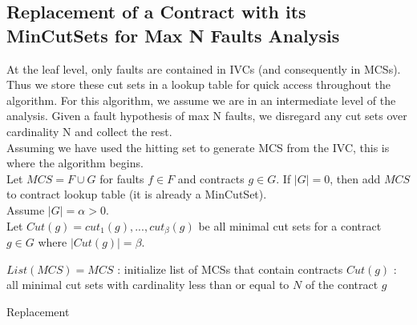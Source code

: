 \subsection{Replacement of a Contract with its MinCutSets for Max N Faults Analysis}

At the leaf level, only faults are contained in IVCs (and consequently in MCSs). Thus we store these cut sets in a lookup table for quick access throughout the algorithm. For this algorithm, we assume we are in an intermediate level of the analysis. Given a fault hypothesis of max N faults, we disregard any cut sets over cardinality N and collect the rest.\\

Assuming we have used the hitting set to generate MCS from the IVC, this is where the algorithm begins. \\

Let $MCS = F \cup G$ for faults $f \in F$ and contracts $g \in G$. If $|G| = 0$, then add $MCS$ to contract lookup table (it is already a MinCutSet). \\

Assume $|G| = \alpha > 0$.\\

Let $Cut(g) = {cut_1(g), ..., cut_{\beta}(g)}$ be all minimal cut sets for a contract $g \in G$ where $|Cut(g)|=\beta$.\\

\begin{algorithm}[H]
	$List(MCS) = {MCS}$ : initialize list of MCSs that contain contracts \;
	$Cut(g)$ : all minimal cut sets with cardinality less than or equal to $N$ of the contract $g$ \;
	\caption{Replacement}
\end{algorithm}

